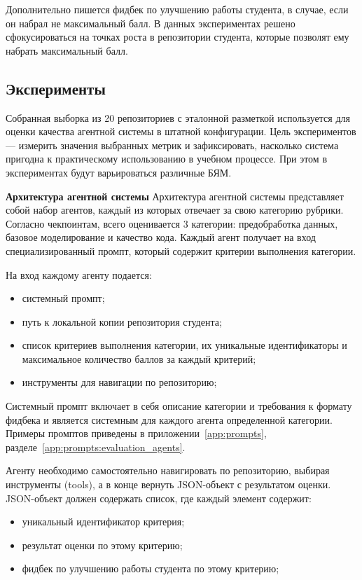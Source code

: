 Дополнительно пишется фидбек по улучшению работы студента, в случае, если он набрал не максимальный балл.
В данных экспериментах решено сфокусироваться на точках роста в репозитории студента, которые позволят ему набрать максимальный балл.

\subsection{Эксперименты}

Собранная выборка из 20 репозиториев с эталонной разметкой используется
для оценки качества агентной системы в штатной конфигурации. Цель
экспериментов --- измерить значения выбранных метрик и зафиксировать,
насколько система пригодна к практическому использованию в учебном процессе.
При этом в экспериментах будут варьироваться различные БЯМ.

\textbf{Архитектура агентной системы}
Архитектура агентной системы представляет собой набор агентов, каждый из которых отвечает за свою категорию рубрики.
Согласно чекпоинтам, всего оценивается 3 категории: предобработка данных, базовое моделирование и качество кода.
Каждый агент получает на вход специализированный промпт, который содержит критерии выполнения категории. 

На вход каждому агенту подается: 

\begin{itemize}
    \item системный промпт;
    \item путь к локальной копии репозитория студента;
    \item список критериев выполнения категории, их уникальные идентификаторы и максимальное количество баллов за каждый критерий;
    \item инструменты для навигации по репозиторию;
\end{itemize}

Системный промпт включает в себя описание категории и требования к формату фидбека и является системным для каждого агента
определенной категории.
Примеры промптов приведены в приложении~\ref{app:prompts}, разделе~\ref{app:prompts:evaluation_agents}.

Агенту необходимо самостоятельно навигировать по репозиторию, выбирая инструменты (tools), а в конце вернуть JSON-объект с результатом оценки. 
JSON-объект должен содержать список, где каждый элемент содержит:

\begin{itemize}
    \item уникальный идентификатор критерия;
    \item результат оценки по этому критерию;
    \item фидбек по улучшению работы студента по этому критерию;
\end{itemize}

